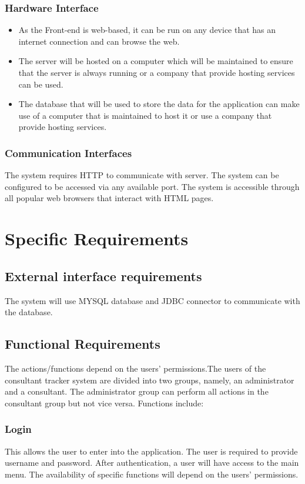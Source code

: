 \documentclass[a4paper, 12pt, oneside]{article}
\begin{document}
\subsubsection{Hardware Interface}
\begin{itemize}
	\item As the Front-end is web-based, it can be run on any device that has an internet connection and can browse the web.
	\item The server will be hosted on a computer which will be maintained to ensure that the server is always running or a company that provide hosting services can be used.
	\item The database that will be used to store the data for the application can make use of a computer that is maintained to host it or use a company that provide hosting services.
\end{itemize}
\subsubsection{Communication Interfaces}
The system requires HTTP to communicate with server. The system can be configured to be accessed via any available port. The system is accessible through all popular web browsers that interact with HTML pages.

\section{Specific Requirements}

\subsection{External interface requirements}
The system will use MYSQL database and JDBC connector to communicate with the database.

\subsection{Functional Requirements}
The actions/functions depend on the users' permissions.The users of the consultant tracker system are divided into two groups, namely,  an administrator and a consultant. The administrator group can perform all actions in the consultant group but not vice versa. 
Functions include:

\subsubsection{Login}
This allows the user to enter into the application. The user is required to provide username and password. After authentication, a user will have access to the main menu. The availability of specific functions will depend on the users' permissions.
\end{document}
